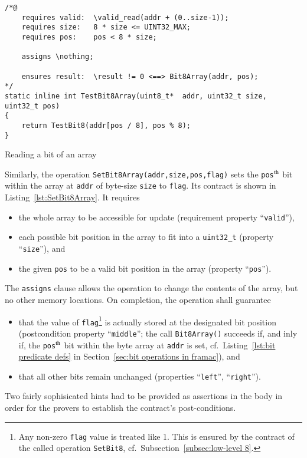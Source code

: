\begin{listing}[hbt]
\begin{minipage}{0.99\textwidth}
\begin{lstlisting}[style=acsl-block]
/*@
    requires valid:  \valid_read(addr + (0..size-1));
    requires size:   8 * size <= UINT32_MAX;
    requires pos:    pos < 8 * size;

    assigns \nothing;

    ensures result:  \result != 0 <==> Bit8Array(addr, pos);
*/
static inline int TestBit8Array(uint8_t*  addr, uint32_t size, uint32_t pos)
{
    return TestBit8(addr[pos / 8], pos % 8);
}
\end{lstlisting}
\end{minipage}
\caption{\label{lst:TestBit8Array}Reading a bit of an  array}
\end{listing}










Similarly, the operation \lstinline{SetBit8Array(addr,size,pos,flag)}
sets the
\lstinline{pos}$^{\mbox{\scriptsize th}}$ bit within the array at
\lstinline{addr} of
byte-size \lstinline{size} to \lstinline{flag}.
%
Its contract is shown in Listing~\ref{lst:SetBit8Array}.
%
It requires
%
\begin{itemize}
\item the whole array to be accessible for update (requirement
	property ``\lstinline{valid}''),
\item each possible bit position in the array to fit into a
	\lstinline{uint32_t} (property ``\lstinline{size}''), and
\item the given \lstinline{pos} to be a valid bit position in the array
	(property ``\lstinline{pos}'').
\end{itemize}
%
The \lstinline{assigns} clause allows the operation to change the
contents of the array,
but no other memory locations.
%
On completion, the operation shall guarantee
\begin{itemize}
\item that the value of \lstinline{flag}\footnote{
		Any non-zero \lstinline{flag} value is treated like 1.
		This is ensured by the contract of the called operation
		\lstinline{SetBit8}, cf.\ Subsection~\ref{subsec:low-level 8}.
	}
	is actually stored at the designated bit
	position (postcondition property ``\lstinline{middle}'';
	the call \lstinline{Bit8Array()} succeeds if, and inly if, the
	\lstinline{pos}$^{\mbox{\scriptsize th}}$ bit within the byte
	array at \lstinline{addr} is set, 
	cf.\ Listing~\ref{lst:bit predicate defs} in
	Section~\ref{sec:bit operations in framac}), and
\item that all other bits remain unchanged 
	(properties ``\lstinline{left}'', ``\lstinline{right}'').
\end{itemize}
%
Two fairly sophisicated hints had to be provided as assertions in
the body in order for
the provers to establish the contract's post-conditions.









